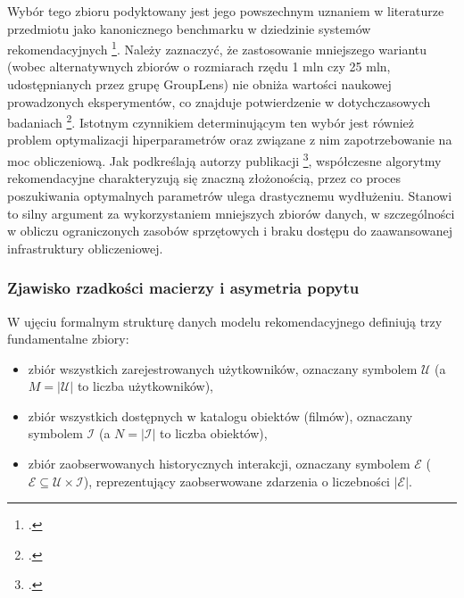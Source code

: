 Wybór tego zbioru podyktowany jest jego powszechnym uznaniem w literaturze przedmiotu jako kanonicznego benchmarku w dziedzinie systemów rekomendacyjnych \footcite{harperMovieLensDatasetsHistory2016, heNeuralCollaborativeFilteringKwiecien032017, zhaoRecBoleUnifiedComprehensive2020}. Należy zaznaczyć, że zastosowanie mniejszego wariantu (wobec alternatywnych zbiorów o rozmiarach rzędu 1 mln czy 25 mln, udostępnianych przez grupę GroupLens) nie obniża wartości naukowej prowadzonych eksperymentów, co znajduje potwierdzenie w dotychczasowych badaniach \footcite{sunAreWeEvaluatingWrzesien222020}. Istotnym czynnikiem determinującym ten wybór jest również problem optymalizacji hiperparametrów oraz związane z nim zapotrzebowanie na moc obliczeniową. Jak podkreślają autorzy publikacji \footcite{anelliTopNRecommendationAlgorithms2022}, współczesne algorytmy rekomendacyjne charakteryzują się znaczną złożonością, przez co proces poszukiwania optymalnych parametrów ulega drastycznemu wydłużeniu. Stanowi to silny argument za wykorzystaniem mniejszych zbiorów danych, w szczególności w obliczu ograniczonych zasobów sprzętowych i braku dostępu do zaawansowanej infrastruktury obliczeniowej.


\subsubsection{Zjawisko rzadkości macierzy i asymetria popytu} %

W ujęciu formalnym strukturę danych modelu rekomendacyjnego definiują trzy fundamentalne zbiory:
\begin{itemize}
    \item zbiór wszystkich zarejestrowanych użytkowników, oznaczany symbolem $\mathcal{U}$ \allowbreak (a $M = |\mathcal{U}|$ to liczba użytkowników),
    \item zbiór wszystkich dostępnych w katalogu obiektów (filmów), oznaczany symbolem $\mathcal{I}$ (a $N = |\mathcal{I}|$ to liczba obiektów),
    \item zbiór zaobserwowanych historycznych interakcji, oznaczany symbolem $\mathcal{E}$ ($\mathcal{E} \subseteq \mathcal{U} \times \mathcal{I}$), reprezentujący zaobserwowane zdarzenia o liczebności $|\mathcal{E}|$.
\end{itemize}

